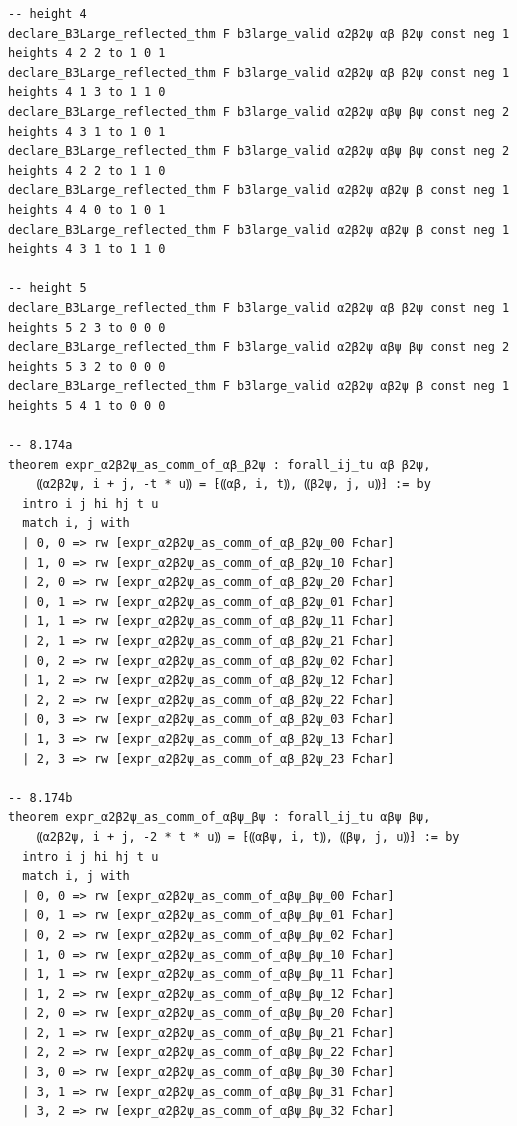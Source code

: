\begin{Verbatim}
-- height 4
declare_B3Large_reflected_thm F b3large_valid α2β2ψ αβ β2ψ const neg 1 heights 4 2 2 to 1 0 1
declare_B3Large_reflected_thm F b3large_valid α2β2ψ αβ β2ψ const neg 1 heights 4 1 3 to 1 1 0
declare_B3Large_reflected_thm F b3large_valid α2β2ψ αβψ βψ const neg 2 heights 4 3 1 to 1 0 1
declare_B3Large_reflected_thm F b3large_valid α2β2ψ αβψ βψ const neg 2 heights 4 2 2 to 1 1 0
declare_B3Large_reflected_thm F b3large_valid α2β2ψ αβ2ψ β const neg 1 heights 4 4 0 to 1 0 1
declare_B3Large_reflected_thm F b3large_valid α2β2ψ αβ2ψ β const neg 1 heights 4 3 1 to 1 1 0

-- height 5
declare_B3Large_reflected_thm F b3large_valid α2β2ψ αβ β2ψ const neg 1 heights 5 2 3 to 0 0 0
declare_B3Large_reflected_thm F b3large_valid α2β2ψ αβψ βψ const neg 2 heights 5 3 2 to 0 0 0
declare_B3Large_reflected_thm F b3large_valid α2β2ψ αβ2ψ β const neg 1 heights 5 4 1 to 0 0 0

-- 8.174a
theorem expr_α2β2ψ_as_comm_of_αβ_β2ψ : forall_ij_tu αβ β2ψ,
    ⸨α2β2ψ, i + j, -t * u⸩ = ⁅⸨αβ, i, t⸩, ⸨β2ψ, j, u⸩⁆ := by
  intro i j hi hj t u
  match i, j with
  | 0, 0 => rw [expr_α2β2ψ_as_comm_of_αβ_β2ψ_00 Fchar]
  | 1, 0 => rw [expr_α2β2ψ_as_comm_of_αβ_β2ψ_10 Fchar]
  | 2, 0 => rw [expr_α2β2ψ_as_comm_of_αβ_β2ψ_20 Fchar]
  | 0, 1 => rw [expr_α2β2ψ_as_comm_of_αβ_β2ψ_01 Fchar]
  | 1, 1 => rw [expr_α2β2ψ_as_comm_of_αβ_β2ψ_11 Fchar]
  | 2, 1 => rw [expr_α2β2ψ_as_comm_of_αβ_β2ψ_21 Fchar]
  | 0, 2 => rw [expr_α2β2ψ_as_comm_of_αβ_β2ψ_02 Fchar]
  | 1, 2 => rw [expr_α2β2ψ_as_comm_of_αβ_β2ψ_12 Fchar]
  | 2, 2 => rw [expr_α2β2ψ_as_comm_of_αβ_β2ψ_22 Fchar]
  | 0, 3 => rw [expr_α2β2ψ_as_comm_of_αβ_β2ψ_03 Fchar]
  | 1, 3 => rw [expr_α2β2ψ_as_comm_of_αβ_β2ψ_13 Fchar]
  | 2, 3 => rw [expr_α2β2ψ_as_comm_of_αβ_β2ψ_23 Fchar]

-- 8.174b
theorem expr_α2β2ψ_as_comm_of_αβψ_βψ : forall_ij_tu αβψ βψ,
    ⸨α2β2ψ, i + j, -2 * t * u⸩ = ⁅⸨αβψ, i, t⸩, ⸨βψ, j, u⸩⁆ := by
  intro i j hi hj t u
  match i, j with
  | 0, 0 => rw [expr_α2β2ψ_as_comm_of_αβψ_βψ_00 Fchar]
  | 0, 1 => rw [expr_α2β2ψ_as_comm_of_αβψ_βψ_01 Fchar]
  | 0, 2 => rw [expr_α2β2ψ_as_comm_of_αβψ_βψ_02 Fchar]
  | 1, 0 => rw [expr_α2β2ψ_as_comm_of_αβψ_βψ_10 Fchar]
  | 1, 1 => rw [expr_α2β2ψ_as_comm_of_αβψ_βψ_11 Fchar]
  | 1, 2 => rw [expr_α2β2ψ_as_comm_of_αβψ_βψ_12 Fchar]
  | 2, 0 => rw [expr_α2β2ψ_as_comm_of_αβψ_βψ_20 Fchar]
  | 2, 1 => rw [expr_α2β2ψ_as_comm_of_αβψ_βψ_21 Fchar]
  | 2, 2 => rw [expr_α2β2ψ_as_comm_of_αβψ_βψ_22 Fchar]
  | 3, 0 => rw [expr_α2β2ψ_as_comm_of_αβψ_βψ_30 Fchar]
  | 3, 1 => rw [expr_α2β2ψ_as_comm_of_αβψ_βψ_31 Fchar]
  | 3, 2 => rw [expr_α2β2ψ_as_comm_of_αβψ_βψ_32 Fchar]


\end{Verbatim}
